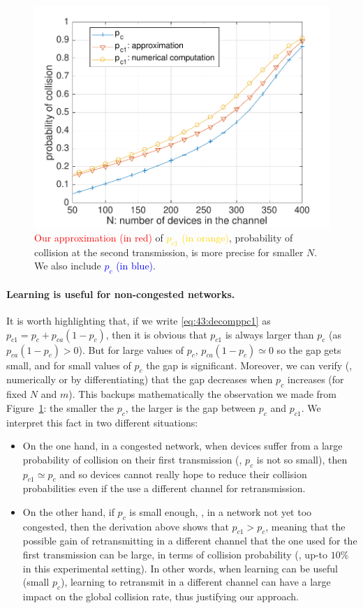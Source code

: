 \begin{figure}[htp!]  %
	\centering
	\includegraphics[width=0.60\linewidth]{Approximation_m10-eps-converted-to.pdf}
	\caption[Our approximation for the probability of collision at the second transmission.]{\textcolor{red}{Our approximation (in red)} of \textcolor{gold}{$p_{c1}$ (in orange)}, probability of collision at the second transmission, is more precise for smaller $N$. We also include \textcolor{blue}{$p_{c}$ (in blue)}.}
	\label{fig:43:Approximation_m10}
\end{figure}


\paragraph{Learning is useful for non-congested networks.}

It is worth highlighting that, if we write \eqref{eq:43:decomppc1} as $p_{c1} = p_c + p_{ca} \left(1-p_c\right)$,
then it is obvious that $p_{c1}$ is always larger than $p_c$ (as $p_{ca} \left(1-p_c\right) > 0$).
But for large values of $p_c$, $p_{ca}\left(1-p_c\right) \simeq 0$ so the gap gets small,
and for small values of $p_c$ the gap is significant.
Moreover, we can verify (\eg, numerically or by differentiating)
that the gap decreases when $p_c$ increases (for fixed $N$ and $m$).
This backups mathematically the observation we made from Figure~\ref{fig:43:Approximation_m10}:
the smaller the $p_c$, the larger is the gap between $p_c$ and $p_{c1}$.
%
We interpret this fact in two different situations:
\begin{itemize}
	\item
	On the one hand, in a congested network, when devices suffer from a large probability of collision on their first transmission (\ie, $p_c$ is not so small), then $p_{c1}\simeq p_c$ and so devices cannot really hope to reduce their collision probabilities even if the use a different channel for retransmission.
	\item
	On the other hand, if $p_c$ is small enough, \ie, in a network not yet too congested, then the derivation above shows that $p_{c1} > p_c$, meaning that the possible gain of retransmitting in a different channel that the one used for the first transmission can be large, in terms of collision probability (\eg, up-to $10\%$ in this experimental setting).
	In other words, when learning can be useful (small $p_c$), learning to retransmit in a different channel can have a large impact on the global collision rate,
	thus justifying our approach.
\end{itemize}

